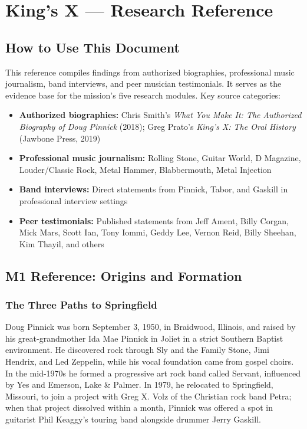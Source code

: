 \documentclass[11pt,letterpaper]{article}
\newcommand{\stageheader}[2]{%
  \noindent\colorbox{#2}{\makebox[\textwidth][l]{%
    \textcolor{white}{\bfseries\sffamily\hspace{6pt}#1\hspace{6pt}}}}%
  \vspace{0.5em}\par%
}
\begin{document}
\newpage

\stageheader{STAGE 2 --- RESEARCH REFERENCE}{secondary}

\section{King's X --- Research Reference}

\subsection{How to Use This Document}

This reference compiles findings from authorized biographies, professional music journalism, band interviews, and peer musician testimonials. It serves as the evidence base for the mission's five research modules. Key source categories:

\begin{itemize}[leftmargin=2em]
\item \textbf{Authorized biographies:} Chris Smith's \textit{What You Make It: The Authorized Biography of Doug Pinnick} (2018); Greg Prato's \textit{King's X: The Oral History} (Jawbone Press, 2019)
\item \textbf{Professional music journalism:} Rolling Stone, Guitar World, D Magazine, Louder/Classic Rock, Metal Hammer, Blabbermouth, Metal Injection
\item \textbf{Band interviews:} Direct statements from Pinnick, Tabor, and Gaskill in professional interview settings
\item \textbf{Peer testimonials:} Published statements from Jeff Ament, Billy Corgan, Mick Mars, Scott Ian, Tony Iommi, Geddy Lee, Vernon Reid, Billy Sheehan, Kim Thayil, and others
\end{itemize}

\subsection{M1 Reference: Origins and Formation}

\subsubsection{The Three Paths to Springfield}

Doug Pinnick was born September 3, 1950, in Braidwood, Illinois, and raised by his great-grandmother Ida Mae Pinnick in Joliet in a strict Southern Baptist environment. He discovered rock through Sly and the Family Stone, Jimi Hendrix, and Led Zeppelin, while his vocal foundation came from gospel choirs. In the mid-1970s he formed a progressive art rock band called Servant, influenced by Yes and Emerson, Lake \& Palmer. In 1979, he relocated to Springfield, Missouri, to join a project with Greg X. Volz of the Christian rock band Petra; when that project dissolved within a month, Pinnick was offered a spot in guitarist Phil Keaggy's touring band alongside drummer Jerry Gaskill.
\end{document}
